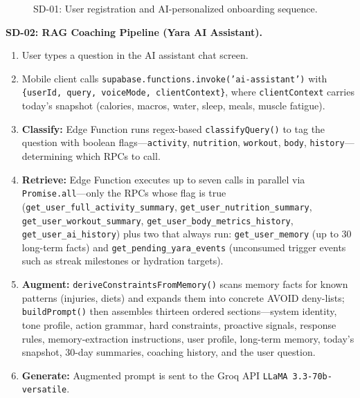 \begin{figure}[H]
{
	}
	\caption{SD-01: User registration and AI-personalized onboarding sequence.}
	\label{fig:sd-01}
\end{figure}

\newpage

\textbf{SD-02: RAG Coaching Pipeline (Yara AI Assistant).}

\begin{enumerate}[noitemsep]
	\item User types a question in the AI assistant chat screen.
	\item Mobile client calls
	\texttt{supabase.functions.invoke('ai-assistant')} with
	\texttt{\{userId, query, voiceMode, clientContext\}}, where
	\texttt{clientContext} carries today's snapshot (calories, macros,
	water, sleep, meals, muscle fatigue).
	\item \textbf{Classify:} Edge Function runs regex-based
	\texttt{classifyQuery()} to tag the question with boolean
	flags---\texttt{activity}, \texttt{nutrition}, \texttt{workout},
	\texttt{body}, \texttt{history}---determining which RPCs to call.
	\item \textbf{Retrieve:} Edge Function executes up to seven calls in
	parallel via \texttt{Promise.all}---only the RPCs whose flag is true
	(\texttt{get\_user\_full\_activity\_summary},
	\texttt{get\_user\_nutrition\_summary},
	\texttt{get\_user\_workout\_summary},
	\texttt{get\_user\_body\_metrics\_history},
	\texttt{get\_user\_ai\_history}) plus two that always run:
	\texttt{get\_user\_memory} (up to 30 long-term facts) and
	\texttt{get\_pending\_yara\_events} (unconsumed trigger events such
	as streak milestones or hydration targets).
	\item \textbf{Augment:} \texttt{deriveConstraintsFromMemory()} scans
	memory facts for known patterns (injuries, diets) and expands them
	into concrete AVOID deny-lists; \texttt{buildPrompt()} then assembles
	thirteen ordered sections---system identity, tone profile, action
	grammar, hard constraints, proactive signals, response rules,
	memory-extraction instructions, user profile, long-term memory,
	today's snapshot, 30-day summaries, coaching history, and the user
	question.
	\item \textbf{Generate:} Augmented prompt is sent to the Groq API 
	\texttt{LLaMA\,3.3-70b-versatile}.
	

\end{enumerate}
